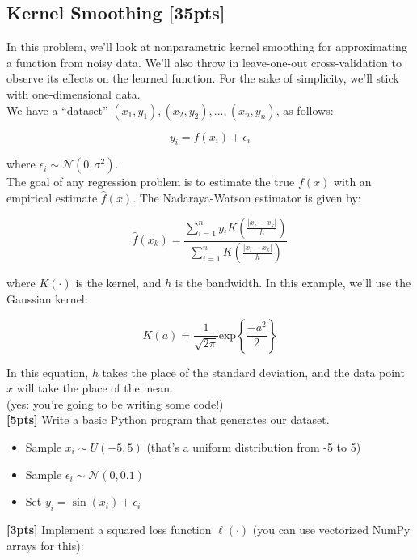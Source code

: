 \documentclass[paper=a4, fontsize=11pt]{scrartcl} %
\numberwithin{figure}{section} %
\numberwithin{table}{section} %
\begin{document}
\subsection{Kernel Smoothing \textbf{[35pts]}}

In this problem, we'll look at nonparametric kernel smoothing for approximating a function from noisy data. We'll also throw in leave-one-out cross-validation to observe its effects on the learned function. For the sake of simplicity, we'll stick with one-dimensional data. \\

We have a ``dataset'' $(x_1, y_1), (x_2, y_2), ..., (x_n, y_n)$, as follows:

$$
y_i = f(x_i) + \epsilon_i
$$

where $\epsilon_i \sim \mathcal{N}(0, \sigma^2)$. \\

The goal of any regression problem is to estimate the true $f(x)$ with an empirical estimate $\hat{f}(x)$. The Nadaraya-Watson estimator is given by:

$$
\hat{f}(x_k) = \frac{\sum_{i = 1}^n y_i K\left( \frac{|x_i - x_k|}{h} \right)}{\sum_{i = 1}^n K \left( \frac{|x_i - x_k|}{h} \right)}
$$

where $K(\cdot)$ is the kernel, and $h$ is the bandwidth. In this example, we'll use the Gaussian kernel:

$$
K(a) = \frac{1}{\sqrt{2 \pi}}  \textrm{exp} \left\{ \frac{-a^2}{2} \right\}
$$

In this equation, $h$ takes the place of the standard deviation, and the data point $x$ will take the place of the mean. \\

(yes: you're going to be writing some code!) \\

\textbf{[5pts]} Write a basic Python program that generates our dataset.

\begin{itemize}
	\item Sample $x_i \sim U(-5, 5)$ (that's a uniform distribution from -5 to 5)
	\item Sample $\epsilon_i \sim \mathcal{N}(0, 0.1)$
	\item Set $y_i = \sin(x_i) + \epsilon_i$
\end{itemize}

\textbf{[3pts]} Implement a squared loss function $\ell(\cdot)$ (you can use vectorized NumPy arrays for this):
\end{document}
